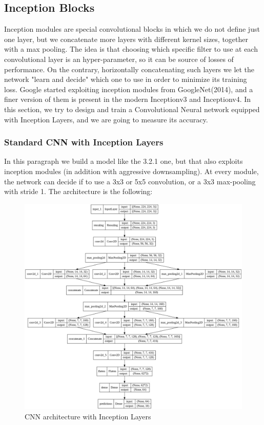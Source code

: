 \subsection{Inception Blocks}
Inception modules are special convolutional blocks in which we do not define just one layer, but we concatenate more layers with different kernel sizes, together with a max pooling. The idea is that choosing which specific filter to use at each convolutional layer is an hyper-parameter, so it can be source of losses of performance. On the contrary, horizontally concatenating such layers we let the network "learn and decide" which one to use in order to minimize its training loss. Google started exploiting inception modules from GoogleNet(2014), and a finer version of them is present in the modern Inceptionv3 and Inceptionv4. In this section, we try to design and train a Convolutional Neural network equipped with Inception Layers, and we are going to measure its accuracy. 

\subsubsection{Standard CNN with Inception Layers}
In this paragraph we build a model like the 3.2.1 one, but that also exploits inception modules (in addition with aggressive downsampling). At every module, the network can decide if to use a 3x3 or 5x5 convolution, or a 3x3 max-pooling with stride 1.
The architecture is the following:


\begin{figure}[H]
	\centering
	\includegraphics[height=0.6\textwidth]{img/scratch/inception_layers.jpg}
	\caption{CNN architecture with Inception Layers}
	\label{fig:InceptionLayersCNN}
\end{figure}

